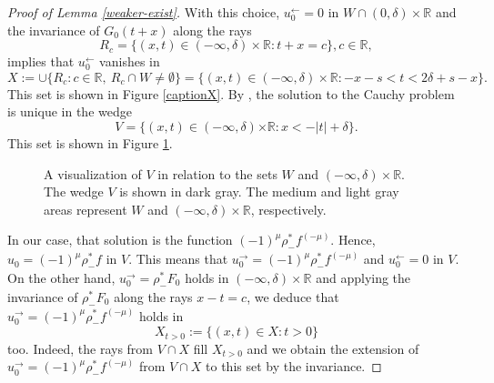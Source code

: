 \documentclass[10pt,a4paper]{article}
\theoremstyle{plain}
\theoremstyle{definition}
\theoremstyle{remark}
\numberwithin{equation}{section}
\newcommand{\R}{\mathbb{R}}
\begin{document}
\begin{proof}[Proof of Lemma \ref{weaker-exist}]
%
%
With this choice, $u_0^\leftarrow = 0$ in $W \cap (0,\delta) \times \R$  and the invariance of $G_0(t+x)$ along the rays 
\[
R_c = \{ (x,t) \in (-\infty,\delta) \times \R :  t + x =c\}, c \in \R, 
\]
implies that $u_0^\leftarrow$
vanishes in 
\[
X:= \cup \{ R_c : c \in \R, \ R_c \cap W \neq \emptyset\} = \{  (x,t) \in (-\infty,\delta) \times \R :  -x-s < t < 2 \delta + s -x \}.
\] 
This set is shown in Figure \ref{captionX}. 
By   \cite[Th. 5.1.6]{duistermaat-FIOs}, the solution to the Cauchy problem is unique in the wedge 
\[
V =  \{ (x,t) \in (-\infty,\delta) {\times \R} : x < -|t| + \delta\}.
\] This set is shown in Figure \ref{captionV}. 
\begin{figure}[ht]
\begin{center}
\caption{A visualization of $V$ in relation to the sets $W$ and $(-\infty, \delta ) \times \R$. The wedge $V$ is shown in dark gray.  The medium and light gray areas represent  $W$ and $(-\infty,\delta) \times \R$, respectively. }\label{captionV}
\end{center}
\end{figure}
In our case, that solution is the function $(-1)^\mu \rho^*_- f^{(-\mu)} $. 
Hence, $u_0 = (-1)^\mu \rho^*_- f$ in $V$. 
This means that   $u_0^\rightarrow= (-1)^\mu \rho^*_- f^{(-\mu)} $ and $u_0^\leftarrow = 0$ in $V$. 
On the other hand, $u_0^\rightarrow= \rho^*_- F_0$ holds in $(-\infty,\delta) \times \R$ and applying the invariance 
of $\rho^*_- F_0$ along the rays $x-t =c$, we deduce that $u_0^\rightarrow =(-1)^\mu \rho^*_- f^{(-\mu)} $ holds in 
\[
X_{t > 0} := \{ (x,t) \in X : t > 0 \}
\]
too.
Indeed, the rays from $V \cap X$ fill $X_{t > 0}$ and we obtain the extension of $u_0^\rightarrow = (-1)^\mu \rho^*_- f^{(-\mu)} $ from $V \cap X$ to this set by the invariance. 

\end{proof}
\end{document}
